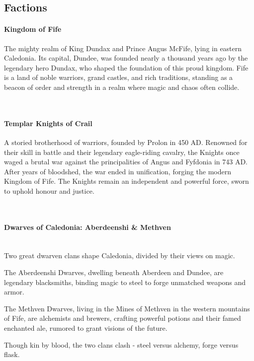\subsection*{Factions}
{\entryfont\paragraph*{Kingdom of Fife} The mighty realm of King Dundax  and Prince Angus McFife, lying in eastern Caledonia. Its capital, Dundee, was founded nearly a thousand years ago by the legendary hero Dundax, who shaped the foundation of this proud kingdom. Fife is a land of noble warriors, grand castles, and rich traditions, standing as a beacon of order and strength in a realm where magic and chaos often collide.}
\hfill\vspace*{-1.7\fontdimen6\font}\\
{\entryfont\paragraph*{Templar Knights of Crail} A storied brotherhood of warriors, founded by Prolon  in 450 AD. Renowned for their skill in battle and their legendary eagle-riding cavalry, the Knights once waged a brutal war against the principalities of Angus and Fyfdonia in 743 AD. After years of bloodshed, the war ended in unification, forging the modern Kingdom of Fife. The Knights remain an independent and powerful force, sworn to uphold honour and justice.}
\hfill\vspace*{-0.5\fontdimen6\font}\\
{\entryfont\paragraph*{Dwarves of Caledonia: Aberdeenshi \& Methven}\hfill\\Two great dwarven clans shape Caledonia, divided by their views on magic.

The Aberdeenshi Dwarves, dwelling beneath Aberdeen and Dundee, are legendary blacksmiths, binding magic to steel to forge unmatched weapons and armor.

The Methven Dwarves, living in the Mines of Methven in the western mountains of Fife, are alchemists and brewers, crafting powerful potions and their famed enchanted ale, rumored to grant visions of the future.

Though kin by blood, the two clans clash - steel versus alchemy, forge versus flask.}
\hfill\vspace*{-0.5\fontdimen6\font}\\
